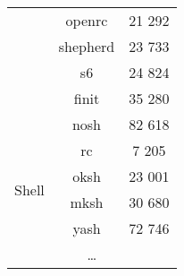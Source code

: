 \begin{table}[!ht]
\begin{tabular}{|c|c|c|}
        \cline{2-3}
        & openrc \cite{openrc} & 21 292 \\
        \cline{2-3}
        & shepherd \cite{shepherd} & 23 733 \\ %
        \cline{2-3}
        & s6 \cite{s6} & 24 824 \\
        \cline{2-3}
        & finit \cite{finit} & 35 280 \\
        \cline{2-3}
        & nosh \cite{nosh} & 82 618 \\ %
        \hline
        \hline
        \multirow{4}{*}{Shell}
        & rc \cite{rc} & 7 205 \\
        \cline{2-3}
        & oksh \cite{oksh} & 23 001 \\
        \cline{2-3}
        & mksh \cite{mksh} & 30 680 \\
        \cline{2-3}
        & yash \cite{yash} & 72 746 \\
        \hline
        \hline
        \multicolumn{3}{|c|}{\dots} \\
        \hline
    \end{tabular}
\end{table}


\newpage

